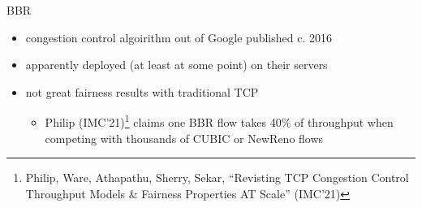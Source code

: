 \begin{frame}{BBR}
\begin{itemize}
\item congestion control algoirithm out of Google published c. 2016
\item apparently deployed (at least at some point) on their servers
\vspace{.5cm}
\item not great fairness results with traditional TCP
    \begin{itemize}
    \item Philip (IMC'21)\footnote{Philip, Ware, Athapathu, Sherry, Sekar, ``Revisting TCP Congestion Control Throughput Models \& Fairness Properties AT Scale'' (IMC'21)} claims one BBR flow takes 40\% of throughput when competing with thousands of CUBIC or NewReno flows
    \end{itemize}
\end{itemize}
\end{frame}
